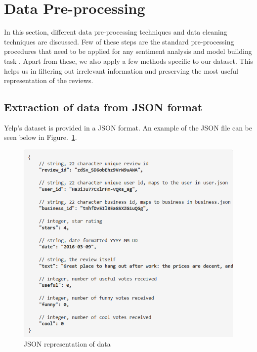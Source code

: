 \documentclass[letterpaper, 10 pt, conference]{ieeeconf}  %
\begin{document}
\section{Data Pre-processing}

In this section, different data pre-processing techniques and data cleaning techniques are discussed. Few of these steps are the standard pre-processing procedures that need to be applied for any sentiment analysis and model building task \cite{c9}. Apart from these, we also apply a few methods specific to our dataset. This helps us in filtering out irrelevant information and preserving the most useful representation of the reviews. 

\subsection{Extraction of data from JSON format}

Yelp's dataset is provided in a JSON format. An example of the JSON file can be seen below in Figure.~\ref{fig:6}.\\
\begin{figure}[htb]
\includegraphics[width = \linewidth]{img/yelp_json.png}
\caption{JSON representation of data}
\label{fig:6}
\end{figure}
\end{document}
